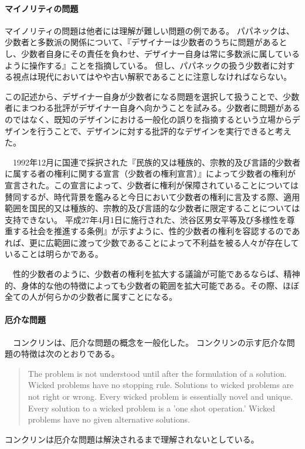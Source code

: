 \documentclass{jsarticle}
\begin{document}
\paragraph*{マイノリティの問題}

マイノリティの問題は他者には理解が難しい問題の例である。
パパネックは、少数者と多数派の関係について、『デザイナーは少数者のうちに問題があるとし、少数者自身にその責任を負わせ、デザイナー自身は常に多数派に属しているように操作する』ことを指摘している。
但し、パパネックの扱う少数者に対する視点は現代においてはやや古い解釈であることに注意しなければならない。

この記述から、デザイナー自身が少数者になる問題を選択して扱うことで、少数者にまつわる批評がデザイナー自身へ向かうことを試みる。少数者に問題があるのではなく、既知のデザインにおける一般化の誤りを指摘するという立場からデザインを行うことで、デザインに対する批評的なデザインを実行できると考えた。

　1992年12月に国連で採択された『民族的又は種族的、宗教的及び言語的少数者に属する者の権利に関する宣言（少数者の権利宣言）』\cite{minorities}によって少数者の権利が宣言された。この宣言によって、少数者に権利が保障されていることについては賛同するが、時代背景を鑑みると今日において少数者の権利に言及する際、適用範囲を国民的又は種族的、宗教的及び言語的な少数者に限定することについては支持できない。
平成27年4月1日に施行された、渋谷区男女平等及び多様性を尊重する社会を推進する条例』\cite{shibuya}が示すように、性的少数者の権利を容認するのであれば、更に広範囲に渡って少数であることによって不利益を被る人々が存在していることは明らかである。

　性的少数者のように、少数者の権利を拡大する議論が可能であるならば、精神的、身体的な他の特徴によっても少数者の範囲を拡大可能である。その際、ほぼ全ての人が何らかの少数者に属すことになる。

\paragraph*{厄介な問題}

　コンクリンは、厄介な問題の概念を一般化した\cite{Conklin}。 コンクリンの示す厄介な問題の特徴は次のとおりである。
\begin{quotation}

The problem is not understood until after the formulation of a solution.
Wicked problems have no stopping rule.
Solutions to wicked problems are not right or wrong.
Every wicked problem is essentially novel and unique.
Every solution to a wicked problem is a 'one shot operation.'
Wicked problems have no given alternative solutions.

\end{quotation}
コンクリンは厄介な問題は解決されるまで理解されないとしている。
\end{document}
